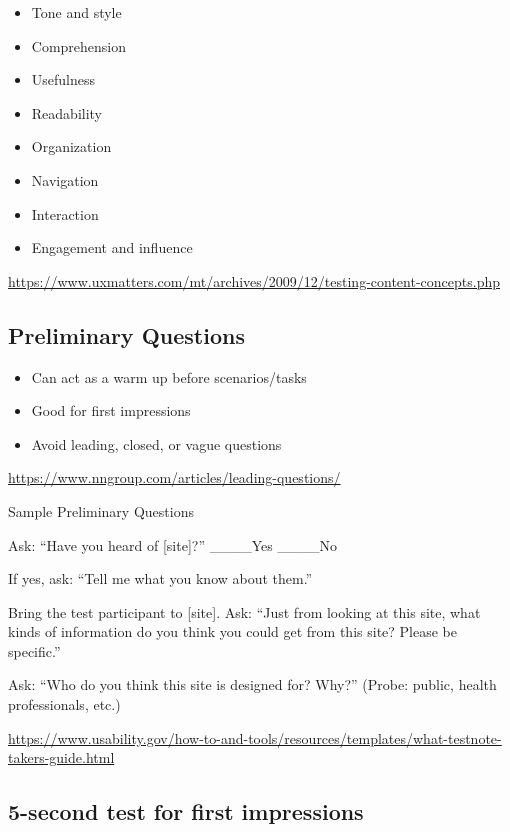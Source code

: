 \documentclass[
]{krantz}
\providecommand{\tightlist}{%
  \setlength{\itemsep}{0pt}\setlength{\parskip}{0pt}}
\begin{document}
\begin{itemize}
\tightlist
\item
  Tone and style
\item
  Comprehension
\item
  Usefulness
\item
  Readability
\item
  Organization
\item
  Navigation
\item
  Interaction
\item
  Engagement and influence
\end{itemize}

\url{https://www.uxmatters.com/mt/archives/2009/12/testing-content-concepts.php}

\hypertarget{preliminary-questions}{%
\subsection{Preliminary Questions}\label{preliminary-questions}}

\begin{itemize}
\tightlist
\item
  Can act as a warm up before scenarios/tasks
\item
  Good for first impressions
\item
  Avoid leading, closed, or vague questions
\end{itemize}

\url{https://www.nngroup.com/articles/leading-questions/}

Sample Preliminary Questions

Ask: ``Have you heard of {[}site{]}?''
\_\_\_\_Yes \_\_\_\_No

If yes, ask:
``Tell me what you know about them.''

Bring the test participant to {[}site{]}.
Ask:
``Just from looking at this site, what kinds of information do you think you could get from this site? Please be specific.''

Ask: ``Who do you think this site is designed for? Why?''
(Probe: public, health professionals, etc.)

\url{https://www.usability.gov/how-to-and-tools/resources/templates/what-testnote-takers-guide.html}

\hypertarget{second-test-for-first-impressions}{%
\subsection{5-second test for first impressions}\label{second-test-for-first-impressions}}
\end{document}
